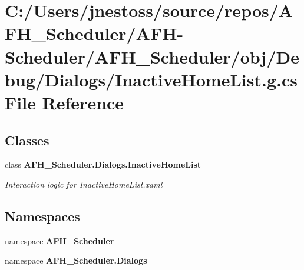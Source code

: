 \section{C\+:/\+Users/jnestoss/source/repos/\+A\+F\+H\+\_\+\+Scheduler/\+A\+F\+H-\/\+Scheduler/\+A\+F\+H\+\_\+\+Scheduler/obj/\+Debug/\+Dialogs/\+Inactive\+Home\+List.g.\+cs File Reference}
\label{_debug_2_dialogs_2_inactive_home_list_8g_8cs}
\subsection*{Classes}
\begin{DoxyCompactItemize}
\item 
class \textbf{ A\+F\+H\+\_\+\+Scheduler.\+Dialogs.\+Inactive\+Home\+List}
\begin{DoxyCompactList}\small\item\em Interaction logic for Inactive\+Home\+List.\+xaml \end{DoxyCompactList}\end{DoxyCompactItemize}
\subsection*{Namespaces}
\begin{DoxyCompactItemize}
\item 
namespace \textbf{ A\+F\+H\+\_\+\+Scheduler}
\item 
namespace \textbf{ A\+F\+H\+\_\+\+Scheduler.\+Dialogs}
\end{DoxyCompactItemize}
